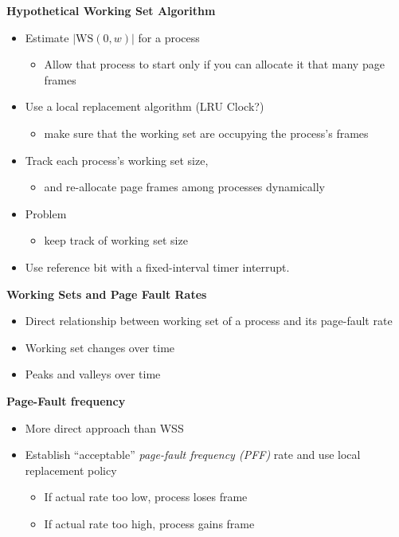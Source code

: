\documentclass[11pt,a4paper]{article}
\begin{document}
\textbf{Hypothetical Working Set Algorithm}
\begin{itemize}
    \item Estimate $|\mathrm{WS}(0, w)|$ for a process
        \begin{itemize}
            \item Allow that process to start only if you can allocate it that many page frames
        \end{itemize}
    \item Use a local replacement algorithm (LRU Clock?)
        \begin{itemize}
            \item make sure that the working set are occupying the process's frames
        \end{itemize}
    \item Track each process's working set size,
        \begin{itemize}
            \item and re-allocate page frames among processes dynamically
        \end{itemize}
    \item Problem
        \begin{itemize}
            \item keep track of working set size
        \end{itemize}
    \item Use reference bit with a fixed-interval timer interrupt.
\end{itemize}

\textbf{Working Sets and Page Fault Rates}
\begin{itemize}
    \item Direct relationship between working set of a process and its page-fault rate
    \item Working set changes over time
    \item Peaks and valleys over time
\end{itemize}

\textbf{Page-Fault frequency}
\begin{itemize}
    \item More direct approach than WSS
    \item Establish ``acceptable'' \emph{page-fault frequency (PFF)} rate and use local
        replacement policy
        \begin{itemize}
            \item If actual rate too low, process loses frame
            \item If actual rate too high, process gains frame
        \end{itemize}
\end{itemize}
\end{document}
